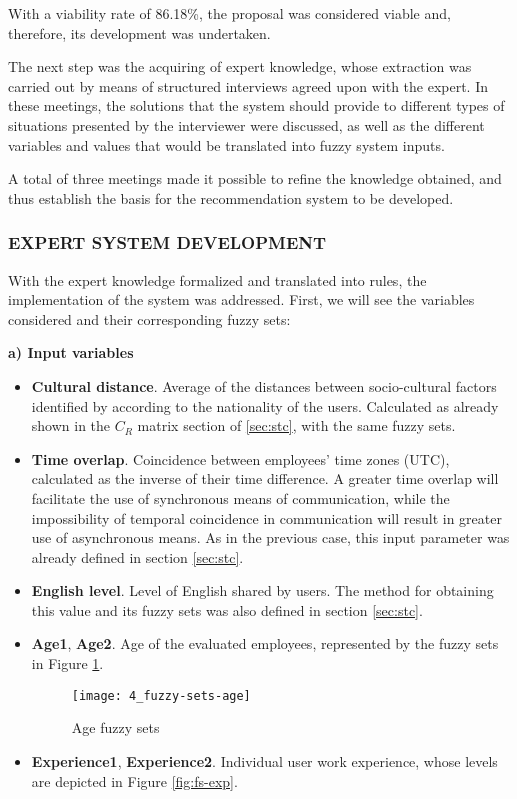 With a viability rate of 86.18\%, the proposal was considered viable and, therefore, its development was undertaken.

The next step was the acquiring of expert knowledge, whose extraction was carried out by means of structured interviews agreed upon with the expert. In these meetings, the solutions that the system should provide to different types of situations presented by the interviewer were discussed, as well as the different variables and values that would be translated into fuzzy system inputs.

A total of three meetings made it possible to refine the knowledge obtained, and thus establish the basis for the recommendation system to be developed.

\subsubsection{EXPERT SYSTEM DEVELOPMENT}

With the expert knowledge formalized and translated into rules, the implementation of the system was addressed. First, we will see the variables considered and their corresponding fuzzy sets:

\indent \textbf{a) Input variables}

\begin{itemize}
\item \textbf{Cultural distance}. Average of the distances between socio-cultural factors identified by \cite{hofstede_cultures_2004} according to the nationality of the users. Calculated as already shown in the $C_R$ matrix section of \ref{sec:stc}, with the same fuzzy sets.
\item \textbf{Time overlap}.  Coincidence between employees’ time zones (UTC), calculated as the inverse of their time difference. A greater time overlap will facilitate the use of synchronous means of communication, while the impossibility of temporal coincidence in communication will result in greater use of asynchronous means. As in the previous case, this input parameter was already defined in section \ref{sec:stc}.
\item \textbf{English level}. Level of English shared by users. The method for obtaining this value and its fuzzy sets was also defined in section \ref{sec:stc}.
\item \textbf{Age1}, \textbf{Age2}. Age of the evaluated employees, represented by the fuzzy sets in Figure \ref{fig:fs-age}.

	\begin{figure}
		\centering
		\texttt{[image: 4\_fuzzy-sets-age]}
		\caption[Age fuzzy sets]{Age fuzzy sets}
		\label{fig:fs-age}
	\end{figure}

\item \textbf{Experience1}, \textbf{Experience2}. Individual user work experience, whose levels are depicted in Figure \ref{fig:fs-exp}.
\end{itemize}

